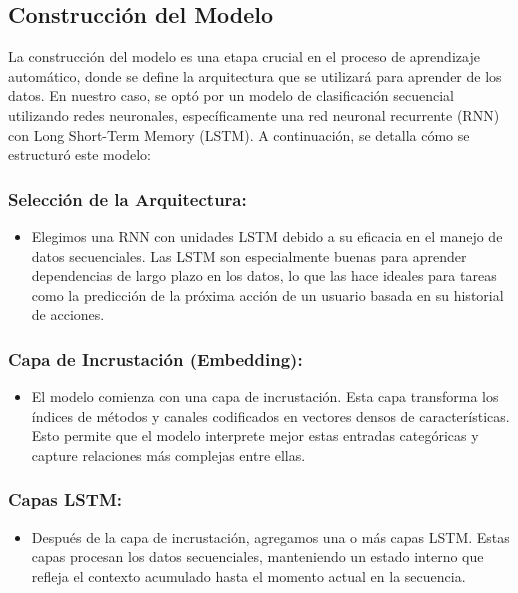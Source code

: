 \subsection{Construcción del Modelo}

La construcción del modelo es una etapa crucial en el proceso de aprendizaje automático, donde se define la arquitectura que se utilizará para aprender de los datos. En nuestro caso, se optó por un modelo de clasificación secuencial utilizando redes neuronales, específicamente una red neuronal recurrente (RNN) con Long Short-Term Memory (LSTM). A continuación, se detalla cómo se estructuró este modelo:

\subsubsection{Selección de la Arquitectura:} 
\begin{itemize}
    \item Elegimos una RNN con unidades LSTM debido a su eficacia en el manejo de datos secuenciales. Las LSTM son especialmente buenas para aprender dependencias de largo plazo en los datos, lo que las hace ideales para tareas como la predicción de la próxima acción de un usuario basada en su historial de acciones.
\end{itemize}

\subsubsection{Capa de Incrustación (Embedding):} 
\begin{itemize}
    \item El modelo comienza con una capa de incrustación. Esta capa transforma los índices de métodos y canales codificados en vectores densos de características. Esto permite que el modelo interprete mejor estas entradas categóricas y capture relaciones más complejas entre ellas.
\end{itemize}

\subsubsection{Capas LSTM:} 
\begin{itemize}
    \item Después de la capa de incrustación, agregamos una o más capas LSTM. Estas capas procesan los datos secuenciales, manteniendo un estado interno que refleja el contexto acumulado hasta el momento actual en la secuencia.
\end{itemize}

